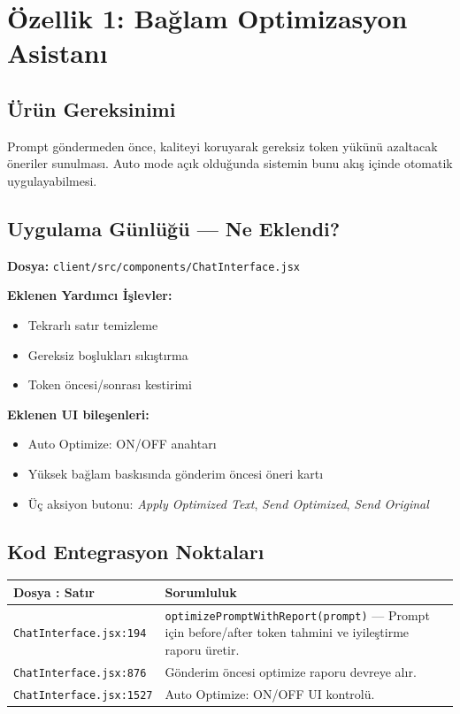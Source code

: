 \documentclass[11pt,a4paper]{article}
\begin{document}
\section{Özellik 1: Bağlam Optimizasyon Asistanı}

\subsection{Ürün Gereksinimi}
Prompt göndermeden önce, kaliteyi koruyarak gereksiz token yükünü azaltacak öneriler sunulması. Auto mode açık olduğunda sistemin bunu akış içinde otomatik uygulayabilmesi.

\subsection{Uygulama Günlüğü — Ne Eklendi?}

\textbf{Dosya:} \texttt{client/src/components/ChatInterface.jsx}

\textbf{Eklenen Yardımcı İşlevler:}
\begin{itemize}[leftmargin=1.5em]
  \item Tekrarlı satır temizleme
  \item Gereksiz boşlukları sıkıştırma
  \item Token öncesi/sonrası kestirimi
\end{itemize}

\textbf{Eklenen UI bileşenleri:}
\begin{itemize}[leftmargin=1.5em]
  \item Auto Optimize: ON/OFF anahtarı
  \item Yüksek bağlam baskısında gönderim öncesi öneri kartı
  \item Üç aksiyon butonu: \textit{Apply Optimized Text}, \textit{Send Optimized}, \textit{Send Original}
\end{itemize}

\subsection{Kod Entegrasyon Noktaları}

\begin{tabularx}{\textwidth}{@{} L{4.5cm} X @{}}
\toprule
\textbf{Dosya : Satır} & \textbf{Sorumluluk} \\
\midrule
\texttt{ChatInterface.jsx:194} & \texttt{optimizePromptWithReport(prompt)} — Prompt için before/after token tahmini ve iyileştirme raporu üretir. \\
\addlinespace
\texttt{ChatInterface.jsx:876} & Gönderim öncesi optimize raporu devreye alır. \\
\addlinespace
\texttt{ChatInterface.jsx:1527} & Auto Optimize: ON/OFF UI kontrolü. \\
\bottomrule
\end{tabularx}
\end{document}
